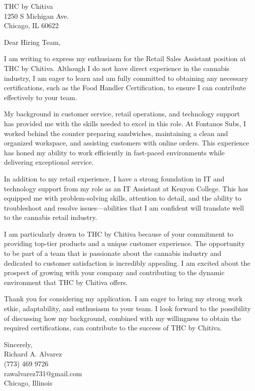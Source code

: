 \documentclass[a4paper,10pt]{letter}
\begin{document}
\begin{letter}{THC by Chitiva \\
1250 S Michigan Ave. \\
Chicago, IL 60622}

\opening{Dear Hiring Team,}

I am writing to express my enthusiasm for the Retail Sales Assistant position at THC by Chitiva. Although I do not have direct experience in the cannabis industry, I am eager to learn and am fully committed to obtaining any necessary certifications, such as the Food Handler Certification, to ensure I can contribute effectively to your team.

My background in customer service, retail operations, and technology support has provided me with the skills needed to excel in this role. At Fontanos Subs, I worked behind the counter preparing sandwiches, maintaining a clean and organized workspace, and assisting customers with online orders. This experience has honed my ability to work efficiently in fast-paced environments while delivering exceptional service.

In addition to my retail experience, I have a strong foundation in IT and technology support from my role as an IT Assistant at Kenyon College. This has equipped me with problem-solving skills, attention to detail, and the ability to troubleshoot and resolve issues—abilities that I am confident will translate well to the cannabis retail industry.

I am particularly drawn to THC by Chitiva because of your commitment to providing top-tier products and a unique customer experience. The opportunity to be part of a team that is passionate about the cannabis industry and dedicated to customer satisfaction is incredibly appealing. I am excited about the prospect of growing with your company and contributing to the dynamic environment that THC by Chitiva offers.

Thank you for considering my application. I am eager to bring my strong work ethic, adaptability, and enthusiasm to your team. I look forward to the possibility of discussing how my background, combined with my willingness to obtain the required certifications, can contribute to the success of THC by Chitiva.

\vspace{1em}

Sincerely, \\
Richard A. Alvarez \\
(773) 469 9726 \\
rawalvarez731@gmail.com \\
Chicago, Illinois

\end{letter}
\end{document}
